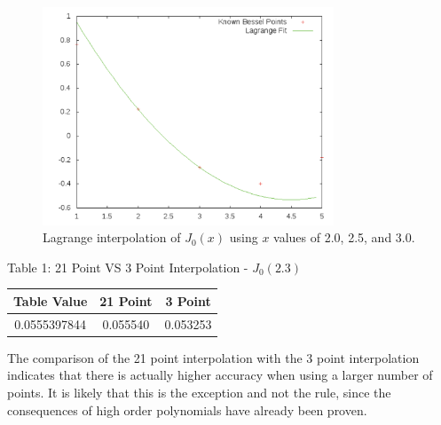 \documentclass[12pt]{article}
\begin{document}
\begin{figure}[!h]
\centering
\includegraphics[width =120 mm, height = 65mm]{Ex_3_3_3point.pdf}
\caption{Lagrange interpolation of $J_0(x)$ using $x$ values of 2.0, 2.5, and 3.0.}
\label{fig:3.3.j0}
\end{figure}
\begin{center}
Table 1:  21 Point VS 3 Point Interpolation - $J_0(2.3)$ \\
\begin{tabular}{ | c | c | c |}
\hline
Table Value &  21 Point & 3 Point  \\ \hline
0.0555397844 & 0.055540 & 0.053253 \\ \hline
\end{tabular}
\end{center}
The comparison of the 21 point interpolation with the 3 point interpolation indicates that there is actually higher accuracy when using a larger number of points.  It is likely that this is the exception and not the rule, since the consequences of high order polynomials have already been proven.
\end{document}
